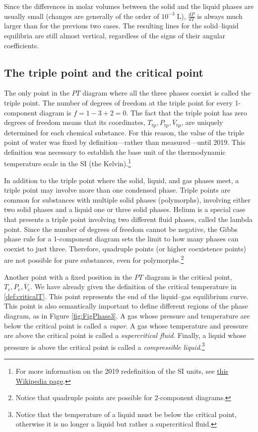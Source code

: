 \documentclass[
  9pt,
]{extbook}
\theoremstyle{definition}
\theoremstyle{definition}
\theoremstyle{definition}
\theoremstyle{remark}
\begin{document}
Since the differences in molar volumes between the solid and the liquid phases are usually small (changes are generally of the order of \(10^{-3}\;\mathrm{L}\)), \(\frac{dP}{dT}\) is always much larger than for the previous two cases. The resulting lines for the solid--liquid equilibria are still almost vertical, regardless of the signs of their angular coefficients.

\hypertarget{the-triple-point-and-the-critical-point}{%
\subsection{The triple point and the critical point}\label{the-triple-point-and-the-critical-point}}

The only point in the \(PT\) diagram where all the three phases coexist is called the triple point. The number of degrees of freedom at the triple point for every 1-component diagram is \(f=1-3+2=0\). The fact that the triple point has zero degrees of freedom means that its coordinates, \({T_{\text{tp}},P_{\text{tp}},\overline{V}_{\text{tp}}}\), are uniquely determined for each chemical substance. For this reason, the value of the triple point of water was fixed by definition---rather than measured---until 2019. This definition was necessary to establish the base unit of the thermodynamic temperature scale in the SI (the Kelvin).\footnote{For more information on the 2019 redefinition of the SI units, see \href{https://en.wikipedia.org/wiki/2019_redefinition_of_the_SI_base_units}{this Wikipedia page}.}

In addition to the triple point where the solid, liquid, and gas phases meet, a triple point may involve more than one condensed phase. Triple points are common for substances with multiple solid phases (polymorphs), involving either two solid phases and a liquid one or three solid phases. Helium is a special case that presents a triple point involving two different fluid phases, called the lambda point. Since the number of degrees of freedom cannot be negative, the Gibbs phase rule for a 1-component diagram sets the limit to how many phases can coexist to just three. Therefore, quadruple points (or higher coexistence points) are not possible for pure substances, even for polymorphs.\footnote{Notice that quadruple points are possible for 2-component diagrams.}

Another point with a fixed position in the \(PT\) diagram is the critical point, \({T_{\text{c}},P_{\text{c}},\overline{V}_{\text{c}}}\). We have already given the definition of the critical temperature in \ref{def:criticalT}. This point represents the end of the liquid--gas equilibrium curve. This point is also semantically important to define different regions of the phase diagram, as in Figure \ref{fig:FigPhase3}. A gas whose pressure and temperature are below the critical point is called a \emph{vapor}. A gas whose temperature and pressure are above the critical point is called a \emph{supercritical fluid}. Finally, a liquid whose pressure is above the critical point is called a \emph{compressible liquid}.\footnote{Notice that the temperature of a liquid must be below the critical point, otherwise it is no longer a liquid but rather a supercritical fluid.}
\end{document}

